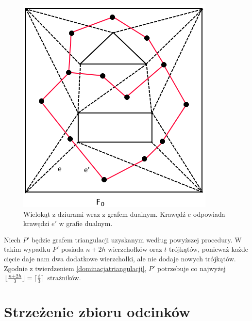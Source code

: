 \documentclass{xmgr}
\DeclarePairedDelimiter\ceil{\lceil}{\rceil}
\DeclarePairedDelimiter\floor{\lfloor}{\rfloor}
\theoremstyle{definition}
\begin{document}
\begin{figure}[h!]
  \centering
    \includegraphics{rysunki/triangulacja_dziury.png}
    \caption{Wielokąt z dziurami wraz z grafem dualnym. Krawędź $e$ odpowiada krawędzi $e'$ w grafie dualnym.}
    \label{fig:triangulacja}
\end{figure} 

\indent Niech $P'$ będzie grafem triangulacji uzyskanym według powyższej procedury. W takim wypadku $P'$ posiada $n + 2h$ wierzchołków oraz $t$ trójkątów, ponieważ każde cięcie daje nam dwa dodatkowe wierzchołki, ale nie dodaje nowych trójkątów. Zgodnie z twierdzeniem \ref{dominacjatriangulacji}, $P'$ potrzebuje co najwyżej $\floor{\frac{n+2h}{3}} = \ceil{\frac{t}{3}}$ strażników.

\chapter{Strzeżenie zbioru odcinków}
\end{document}
